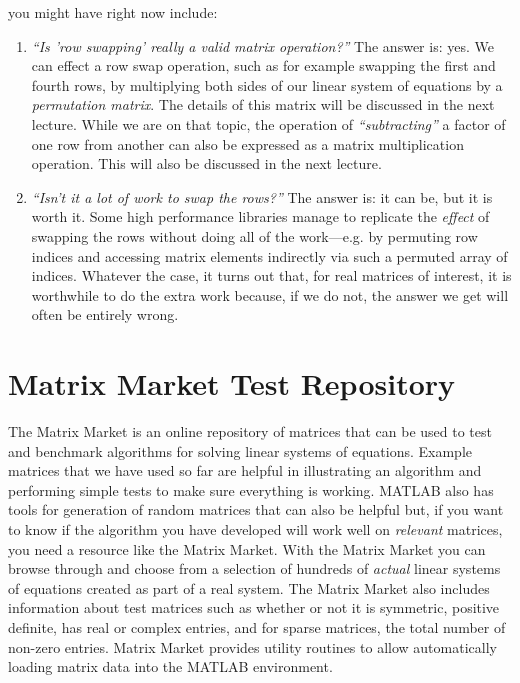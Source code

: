 
 you might have right now include:
\begin{enumerate}
\item \emph{``Is 'row swapping' really a valid matrix operation?''} The answer is: yes.  We can effect a row swap operation, such as for example swapping the first and fourth rows, by multiplying both sides of our linear system of equations by a \emph{permutation matrix}.  The details of this matrix will be discussed in the next lecture.  While we are on that topic, the operation of \emph{``subtracting''} a factor of one row from another can also be expressed as a matrix multiplication operation.  This will also be discussed in the next lecture.

\item \emph{``Isn't it a lot of work to swap the rows?''} The answer is: it can be, but it is worth it.  Some high performance libraries manage to replicate the \emph{effect} of swapping the rows without doing all of the work---e.g. by permuting row indices and accessing matrix elements indirectly via such a permuted array of indices.  Whatever the case, it turns out that, for real matrices of interest, it is worthwhile to do the extra work because, if we do not, the answer we get will often be entirely wrong.

\end{enumerate}

\section{Matrix Market Test Repository}

The Matrix Market is an online repository of matrices that can be used to test and benchmark algorithms for solving linear systems of equations.\cite{MatrixMarket}  Example matrices that we have used so far are helpful in illustrating an algorithm and performing simple tests to make sure everything is working.  MATLAB also has tools for generation of random matrices that can also be helpful but, if you want to know if the algorithm you have developed will work well on \emph{relevant} matrices, you need a resource like the Matrix Market.  With the Matrix Market you can browse through and choose from a selection of hundreds of \emph{actual} linear systems of equations created as part of a real system.  The Matrix Market also includes information about test matrices such as whether or not it is symmetric, positive definite, has real or complex entries, and for sparse matrices, the total number of non-zero entries.  Matrix Market provides utility routines to allow automatically loading matrix data into the MATLAB environment.

